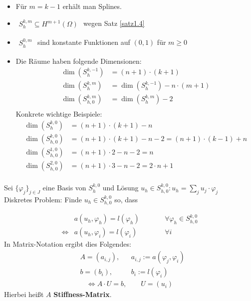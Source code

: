 \begin{bemerkung}\
\begin{itemize}
\item Für $m=k-1$ erhält man Splines.
\item $\begin{aligned}
S_h^{k,m}\subseteq H^{m+1}(\Omega)
\end{aligned}$ wegen Satz \ref{satz1.4}
\item $\begin{aligned}
S_h^{0,m}
\end{aligned}$ sind konstante Funktionen auf $(0,1)$ für $m\geq0$
\item Die Räume haben folgende Dimensionen:
\begin{align*}
\dim\left(S_h^{k,-1}\right)&=(n+1)\cdot(k+1)\\
\dim\left(S_h^{k,m}\right)&=\dim\left(S_h^{k,-1}\right)-n\cdot(m+1)\\
\dim\left(S_{h,0}^{k,m}\right)&=\dim\left(S_h^{k,m}\right)-2\\
\end{align*}
Konkrete wichtige Beispiele:
\begin{align*}
\dim\left(S_h^{k,0}\right)&=(n+1)\cdot(k+1)-n\\
\dim\left(S_{h,0}^{k,0}\right)&=(n+1)\cdot(k+1)-n-2=(n+1)\cdot(k-1)+n\\
\dim\left(S_{h,0}^{1,0}\right)&=(n+1)\cdot 2-n-2=n\\
\dim\left(S_{h,0}^{2,0}\right)&=(n+1)\cdot 3-n-2=2\cdot n+1\\
\end{align*}
\end{itemize}
\end{bemerkung}
Sei $\lbrace\varphi_j\rbrace_{j\in J}$ eine Basis von $S_h^{k,0}$
und Lösung $u_h\in S_{h,0}^{k,0}: u_h=\sum\limits_j u_j\cdot\varphi_j$\\
Diskretes Problem: Finde $u_h\in S_{h,0}^{k,0}$ so, dass 

\begin{align*}
	&a(u_h,\varphi_h)=l(\varphi_h)&\qquad&\forall \varphi_h\in S_{h,0}^{k,0}\\
	\Longleftrightarrow &a(u_h,\varphi_i)=l(\varphi_i)&\qquad&\forall i
\end{align*}
In Matrix-Notation ergibt dies Folgendes:
\begin{align*}
	&A=(a_{i,j}),&&a_{i,j}:=a(\varphi_j,\varphi_i)\\
	&b=(b_i),&&b_i:=l(\varphi_i)
\end{align*}
\begin{align*}
\Longleftrightarrow A\cdot U=b,\qquad U=(u_i)
\end{align*}
Hierbei heißt $A$ \textbf{Stiffness-Matrix}.

